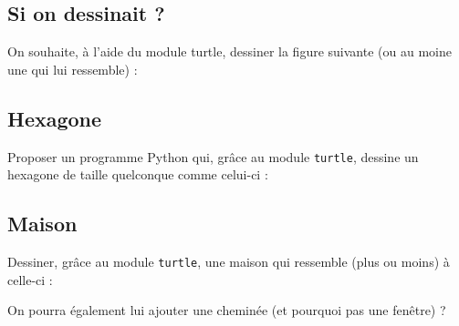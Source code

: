 \documentclass[12pt,a4paper, oneside]{article}
\theoremstyle{definition}
\begin{document}
   \subsection{Si on dessinait ?}\label{subsec:si-on-dessinait-?}
      On souhaite, à l'aide du module turtle, dessiner la figure suivante (ou au moine une qui lui ressemble) :
   \begin{center}
   \end{center}
   
   \subsection{Hexagone}\label{subsec:hexagone}
   Proposer un programme Python qui, grâce au module \texttt{turtle}, dessine un hexagone de taille quelconque comme celui-ci :
   \begin{center}
   \end{center}

   \subsection{Maison}
   Dessiner, grâce au module \texttt{turtle}, une maison qui ressemble (plus ou moins) à celle-ci :
   \begin{center}
   \end{center}

   On pourra également lui ajouter une cheminée (et pourquoi pas une fenêtre) ?
   
\end{document}
